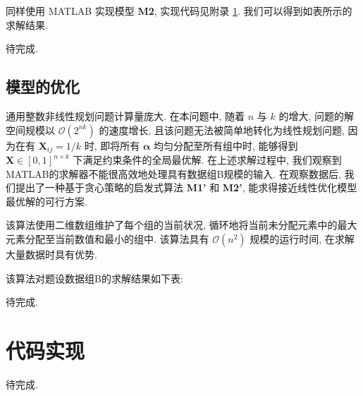 \documentclass[]{ctexart}
\begin{document}
同样使用 MATLAB 实现模型 \textbf{M2}, 实现代码见附录 \ref{appn_code}. 我们可以得到如表所示的求解结果.

待完成.

\subsection{模型的优化}

通用整数非线性规划问题计算量庞大. 在本问题中, 随着 $n$ 与 $k$ 的增大, 问题的解空间规模以 $\mathcal{O}(2^{nk})$ 的速度增长, 且该问题无法被简单地转化为线性规划问题, 因为在有 $\bm{X}_{ij} = 1/k$ 时, 即将所有 $\bm{\alpha}$ 均匀分配至所有组中时, 能够得到 $\bm{X} \in [0,1]^{n \times k}$ 下满足约束条件的全局最优解. 在上述求解过程中, 我们观察到MATLAB的求解器不能很高效地处理具有数据组B规模的输入. 在观察数据后, 我们提出了一种基于贪心策略的启发式算法 \textbf{M1'} 和 \textbf{M2'}, 能求得接近线性优化模型最优解的可行方案.

该算法使用二维数组维护了每个组的当前状况, 循环地将当前未分配元素中的最大元素分配至当前数值和最小的组中. 该算法具有 $\mathcal{O}(n^2)$ 规模的运行时间, 在求解大量数据时具有优势.

该算法对题设数据组B的求解结果如下表:

待完成.

\appendix

\section{代码实现} \label{appn_code}

待完成.
\end{document}
